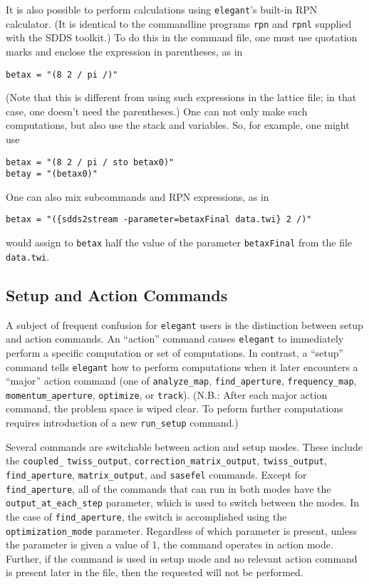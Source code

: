 \documentclass[11pt]{article}
\begin{document}
It is also possible to perform calculations using {\tt elegant}'s built-in RPN calculator.
(It is identical to the commandline programs {\tt rpn} and {\tt rpnl} supplied with
the SDDS toolkit.)
To do this in the command file, one must use quotation marks and
enclose the expression in parentheses, as in 
\begin{verbatim}
betax = "(8 2 / pi /)"
\end{verbatim}
(Note that this is different from using such expressions in the lattice file; in that
case, one doesn't need the parentheses.)
One can not only make such computations, but also use the stack and variables.
So, for example, one might use
\begin{verbatim}
betax = "(8 2 / pi / sto betax0)"
betay = "(betax0)"
\end{verbatim}
One can also mix subcommands and RPN expressions, as in
\begin{verbatim}
betax = "({sdds2stream -parameter=betaxFinal data.twi} 2 /)"
\end{verbatim}
would assign to {\tt betax} half
the value of the parameter {\tt betaxFinal} from
the file {\tt data.twi}.

\subsection{Setup and Action Commands}
 
A subject of frequent confusion for {\tt elegant} users is the
distinction between setup and action commands.  An ``action'' command
causes {\tt elegant} to immediately perform a specific computation or
set of computations.  In contrast, a ``setup'' command tells {\tt elegant}
how to perform computations when it later encounters a ``major'' action
command (one of \verb|analyze_map|, \verb|find_aperture|, \verb|frequency_map|, \verb|momentum_aperture|, \verb|optimize|, 
or \verb|track|).
(N.B.: After each major action command, the problem space is wiped clear. 
To peform further computations requires introduction of a new \verb|run_setup| command.)

Several commands are switchable between action and setup modes.  These
include the \verb|coupled_| \verb|twiss_output|,
\verb|correction_matrix_output|, \verb|twiss_output|,
\verb|find_aperture|, \verb|matrix_output|, and \verb|sasefel|
commands.  Except for \verb|find_aperture|, all of the commands that
can run in both modes have the \verb|output_at_each_step| parameter,
which is used to switch between the modes.  In the case of
\verb|find_aperture|, the switch is accomplished using the
\verb|optimization_mode| parameter.  Regardless of which parameter is
present, unless the parameter is given a value of 1, the command
operates in action mode.  Further, if the command is used in setup mode
and no relevant action command is present later in the file, then the requested
will not be performed.
\end{document}
